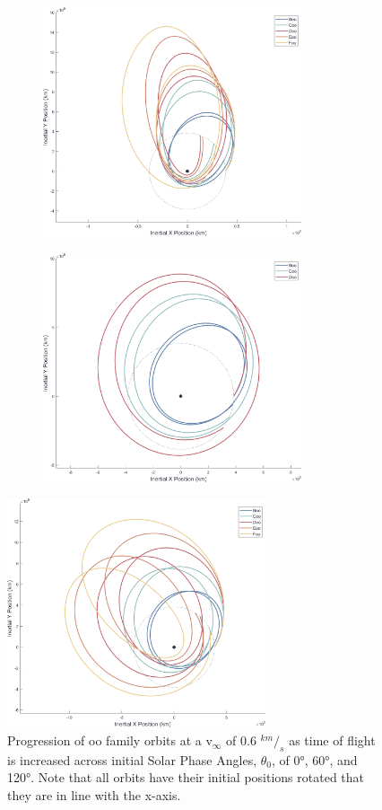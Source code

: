 \documentclass[letterpaper, paper,11pt]{AAS}	%
\begin{document}
\clearpage

\begin{figure}[h!]
    \begin{subfigure}{}
        \includegraphics[trim=75 50 0 0, clip, width=3in]{./figs/mooni_FamilyPlot_oo_vInf0.6_theta0.png}
    \end{subfigure}
    \begin{subfigure}{}
        \includegraphics[trim=75 50 0 0, clip, width=3in]{./figs/mooni_FamilyPlot_oo_vInf0.6_theta60.png}
    \end{subfigure}
\end{figure}
\begin{figure}[h]
    \centering
    \includegraphics[trim=75 50 0 0, clip, width=3in]{./figs/mooni_FamilyPlot_oo_vInf0.6_theta120.png}
    \caption{Progression of oo family orbits at a v\(_\infty\) of 0.6 \(^{km}/_s\) as time of flight is increased across initial Solar Phase Angles, \(\theta_0\), of 0°, 60°, and 120°. Note that all orbits have their initial positions rotated that they are in line with the x-axis.}
    \label{fig:mooni_famPlot_oo_0.6}
\end{figure}
\end{document}
